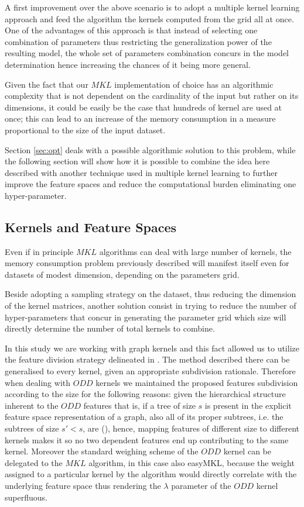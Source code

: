 A first improvement over the above scenario is to adopt a multiple kernel learning
approach and feed the algorithm the kernels computed from the grid all at once.
One of the advantages of this approach is that instead of selecting one combination
of parameters thus restricting the generalization power of the resulting model,
the whole set of parameters combination concurs in the model determination hence
increasing the chances of it being more general.

Given the fact that our $MKL$ implementation of choice has an algorithmic
complexity that is not dependent on the cardinality of the input but rather on
its dimensions, it could be easily be the case that hundreds of kernel are used
at once; this can lead to an increase of the memory consumption in a measure
proportional to the size of the input dataset.

Section \ref{sec:opt} deals with a possible algorithmic solution to this problem,
while the following section will show how it is possible to combine the idea here
described with another technique used in multiple kernel learning to further
improve the feature spaces and reduce the computational burden eliminating
one hyper-parameter.

\subsection{Kernels and Feature Spaces}
\label{subsec:features}

Even if in principle $MKL$ algorithms can deal with large number of kernels, the
memory consumption problem previously described will manifest itself even for
datasets of modest dimension, depending on the parameters grid.

Beside adopting a sampling strategy on the dataset, thus reducing the dimension
of the kernel matrices, another solution consist in trying to reduce the number 
of hyper-parameters that concur in generating the parameter grid which size will
directly determine the number of total kernels to combine.

In this study we are working with graph kernels and this fact allowed us to utilize
the feature division strategy delineated in \cite{gmkl}.
The method described there can be generalised to every kernel, given an appropriate
subdivision rationale.
Therefore when dealing with $ODD$ kernels we maintained the proposed features
subdivision according to the size for the following reasons:
given the hierarchical structure inherent to the $ODD$ features that is, if a tree
of size $s$ is present in the explicit feature space representation of a graph,
also all of its proper subtrees, i.e. the subtrees of size $s' < s$, are (\cite{gmkl}),
hence, mapping features of different size to different kernels makes it so no two
dependent features end up contributing to the same kernel.
Moreover the standard weighing scheme of the $ODD$ kernel can be delegated to
the $MKL$ algorithm, in this case also easyMKL, because the weight assigned to a
particular kernel by the algorithm would directly correlate with the underlying
feature space thus rendering the $\lambda$ parameter of the $ODD$ kernel superfluous.

